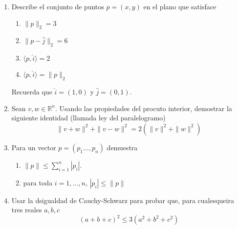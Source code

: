\documentclass{article}
\newtheorem{definicion}{Definici\'on}
\theoremstyle{definition}
\begin{document}
\begin{enumerate}
       
       
       \section{Producto interior, norma}


	\begin{definicion}
	En $\mathbb{R}^n$ se define la norma de un vector $p=(p_1,\dots, p_k)$ como
	$$
		\|p\|=\left( \sum_{k=1}^k p_k\right)^{1/2}
	$$
	
	La distancia entre dos puntos $p,q \in \mathbb{R}^n$ se define como
	$$
	\|p-q\|	
	$$
	\end{definicion}
       
       \item Describe el conjunto de puntos $p=(x,y)$ en el  plano que satisface
         \begin{enumerate}
         \item $\|p\|_2=3$
         \item $\|p-\hat{j}\|_2=6$
         \item $ \langle p, \hat{i} \rangle=2$
         \item $\langle p, \hat{i} \rangle = \|p\|_2$
         \end{enumerate}
         Recuerda que $\hat{i}=(1,0)$ y $\hat{j}=(0,1)$.



       \item Sean $v, w\in \mathbb{R}^n$.
       	Usando las propiedades del procuto interior, demostrar la siguiente identidad (llamada ley del paralelogramo)
         $$
         \|v+w\|^2+\|v-w\|^2=2(\|v\|^2+\|w\|^2)
         $$


        
			\item Para un vector $p=(p_1\dots, p_n) $ demuestra
			\begin{enumerate}
			\item $	\|p\| \leq \sum_{i=1}^n|p_i| $. 
			\item para toda $i=1,\dots, n$, $|p_i| \leq \|p\|$
			\end{enumerate}
                
       \item Usar la dsigualdad de Cauchy-Schwarz para probar que, para cualesqueira tres
         reales $a,b,c$
         $$
         (a+b+c)^2 \leq 3(a^2+b^2+c^2)
         $$
         

       \end{enumerate}


  
       
\end{document}
